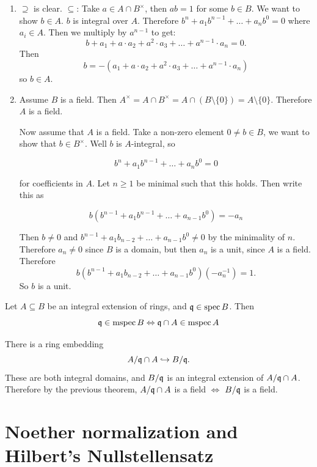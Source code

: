 \documentclass{article}
\begin{document}
\proof \hspace{0.1cm}
\begin{enumerate}
    \item $\supseteq$ is clear. \gap 
    $\subseteq$: Take $a \in A \cap B^{\times}$, then $ab=1$ for some $b \in B$. We want to show $b \in A$. $b$ is integral over $A$. Therefore $b^{n} + a_{1}b^{n-1} + \dots + a_{n}b^{0} =0$ where $a_{i} \in A$. Then we multiply by $a^{n-1}$ to get: \[ b + a_{1} + a \cdot a_{2} + a^{2} \cdot a_{3} + \dots + a^{n-1} \cdot a_{n} = 0.\] Then \[ b = -(a_{1} + a \cdot a_{2} + a^{2} \cdot a_{3} + \dots + a^{n-1} \cdot a_{n}) \] so $b \in A$.
    \item Assume $B$ is a field. Then $A^{\times} = A \cap B^{\times} = A \cap (B \setminus \{ 0 \}) = A \setminus \{ 0 \}$. Therefore $A$ is a field.\gap 
    
    Now assume that $A$ is a field. Take a non-zero element $0 \neq b \in B$, we want to show that $b \in B^{\times}$. Well $b$ is $A$-integral, so 

    \[b^{n} + a_{1}b^{n-1} + \dots + a_{n}b^{0} = 0\] 
    
    for coefficients in $A$. Let $n \geq 1$ be minimal such that this holds. Then write this as 

    \[ b(b^{n-1} + a_{1}b^{n-1} + \dots + a_{n-1}b^{0})=-a_{n}\]

    Then $b \neq 0$ and $b^{n-1} + a_{1}b_{n-2} + \dots + a_{n-1}b^{0} \neq 0$ by the minimality of $n$. Therefore $a_{n} \neq 0$ since $B$ is a domain, but then $a_{n}$ is a unit, since $A$ is a field. Therefore \[ b(b^{n-1} + a_{1}b_{n-2} + \dots + a_{n-1}b^{0})(-a_{n}^{-1})=1.\] So $b$ is a unit.
\end{enumerate}
\begin{corr}{}
    Let $A \subseteq B$ be an integral extension of rings, and $\mathfrak{q} \in \operatorname{spec} B$. Then \[ \mathfrak{q} \in \operatorname{mspec} B \Leftrightarrow \mathfrak{q} \cap A \in \operatorname{mspec} A\]
\end{corr}
\proof There is a ring embedding \[ A / \mathfrak{q} \cap A \hookrightarrow B / \mathfrak{q}.\] These are both integral domains, and $B / \mathfrak{q}$ is an integral extension of $A / \mathfrak{q} \cap A$. Therefore by the previous theorem, $A/ \mathfrak{q} \cap A$ is a field $\Leftrightarrow$ $B/\mathfrak{q}$ is a field.
\endproof 
\section{Noether normalization and Hilbert's Nullstellensatz}
\end{document}
